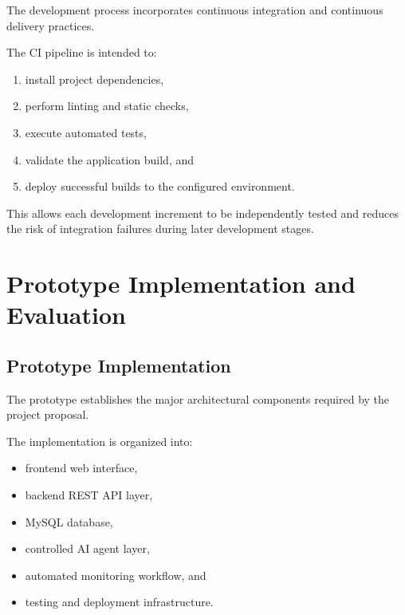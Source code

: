 \documentclass{tietreport}
\begin{document}
The development process incorporates continuous integration and continuous
delivery practices.

The CI pipeline is intended to:

\begin{enumerate}

    \item install project dependencies,

    \item perform linting and static checks,

    \item execute automated tests,

    \item validate the application build, and

    \item deploy successful builds to the configured environment.

\end{enumerate}

This allows each development increment to be independently tested and
reduces the risk of integration failures during later development stages.


\chapter{Prototype Implementation and Evaluation}

\section{Prototype Implementation}

The prototype establishes the major architectural components required by
the project proposal.

The implementation is organized into:

\begin{itemize}

    \item frontend web interface,

    \item backend REST API layer,

    \item MySQL database,

    \item controlled AI agent layer,

    \item automated monitoring workflow, and

    \item testing and deployment infrastructure.

\end{itemize}
\end{document}
